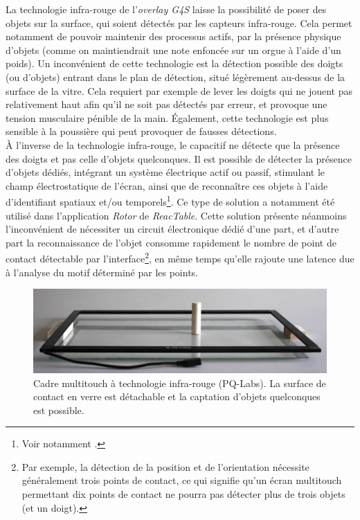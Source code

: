 \noindent La technologie infra-rouge de l'\textit{overlay G4S} laisse la possibilité de poser des objets sur la surface, qui soient détectés par les capteurs infra-rouge. Cela permet notamment de pouvoir maintenir des processus actifs, par la présence physique d'objets (comme on maintiendrait une note enfoncée sur un orgue à l'aide d'un poids). Un inconvénient de cette technologie est la détection possible des doigts (ou d'objets) entrant dans le plan de détection, situé légèrement au-dessus de la surface de la vitre. Cela requiert par exemple de lever les doigts qui ne jouent pas relativement haut afin qu'il ne soit pas détectés par erreur, et provoque une tension musculaire pénible de la main. Également, cette technologie est plus sensible à la poussière qui peut provoquer de fausses détections.\\
\indent À l'inverse de la technologie infra-rouge, le capacitif ne détecte que la présence des doigts et pas celle d'objets quelconques. Il est possible de détecter la présence d'objets dédiés, intégrant un système électrique actif ou passif, stimulant le champ électrostatique de l'écran, ainsi que de reconnaître ces objets à l'aide d'identifiant spatiaux et/ou temporels\footnote{Voir notamment \cite{rekimoto_datatiles_2001, yu_tuic_2011}.}. Ce type de solution a notamment été utilisé dans l'application \textit{Rotor} de \textit{ReacTable}. Cette solution présente néanmoins l'inconvénient de nécessiter un circuit électronique dédié d'une part, et d'autre part la reconnaissance de l'objet consomme rapidement le nombre de point de contact détectable par l'interface\footnote{Par exemple, la détection de la position et de l'orientation nécessite généralement trois points de contact, ce qui signifie qu'un écran multitouch permettant dix points de contact ne pourra pas détecter plus de trois objets (et un doigt).}, en même temps qu'elle rajoute une latence due à l'analyse du motif déterminé par les points.
\begin{figure}[!htbp]
	\captionsetup{format=plain}%
	\includegraphics[width=\textwidth]{gfx/05_interfaces/PQlabs-G4overlay.jpg}
	\caption[Cadre multitouch à technologie infra-rouge]{Cadre multitouch à technologie infra-rouge (PQ-Labs). La surface de contact en verre est détachable et la captation d'objets quelconques est possible.}
	\label{fig:interface:PQlabs-G4overlay}
\end{figure}

